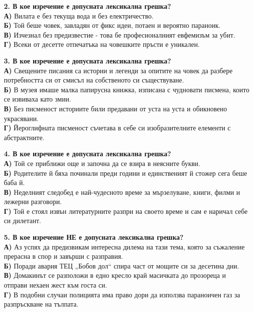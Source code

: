 \documentclass[12pt,a4paper]{article}
\begin{document}
\vspace{0.6cm}

\noindent
\textbf{2. В кое изречение е допусната лексикална грешка?} \\
\noindent
\textbf{А)} Вилата е без текуща вода и без електричество. \\
\textbf{Б)} Той беше човек, завладян от фикс идеи, потаен и вероятно параноик. \\
\textbf{В)} Изчезнал без предизвестие - това бе професионалният евфемизъм за убит. \\
\textbf{Г)} Всеки от десетте отпечатъка на човешките пръсти е уникален.

\vspace{0.6cm}

\noindent
\textbf{3. В кое изречение е допусната лексикална грешка?} \\
\noindent
\textbf{А)} Свещените писания са истории и легенди за опитите на човек да разбере потребността си от смисъл на собственото си съществуване. \\
\textbf{Б)} В музея имаше малка папирусна книжка, изписана с чудновати писмена, които се извиваха като змии. \\
\textbf{В)} Без писменост историите били предавани от уста на уста и обикновено украсявани. \\
\textbf{Г)} Йероглифната писменост съчетава в себе си изобразителните елементи с абстрактните.

\vspace{0.6cm}

\noindent
\textbf{4. В кое изречение е допусната лексикална грешка?} \\
\noindent
\textbf{А)} Той се приближи още и започна да се взира в неясните букви. \\
\textbf{Б)} Родителите й бяха починали преди години и единственият й стожер сега беше баба й. \\
\textbf{В)} Неделният следобед е най-чудесното време за мързелуване, книги, филми и лежерни разговори. \\
\textbf{Г)} Той е стоял извън литературните разпри на своето време и сам е наричал себе си дилетант.

\vspace{0.6cm}

\noindent
\textbf{5. В кое изречение НЕ е допусната лексикална грешка?} \\
\noindent
\textbf{А)} Аз успях да предизвикам интересна дилема на тази тема, която за съжаление прерасна в спор и завърши с разправия. \\
\textbf{Б)} Поради авария ТЕЦ „Бобов дол“ спира част от мощите си за десетина дни. \\
\textbf{В)} Домакинът се разположи в едно кресло край масичката до прозореца и отправи нехаен жест към госта си. \\
\textbf{Г)} В подобни случаи полицията има право дори да използва параноичен газ за разпръскване на тълпата.
\end{document}

